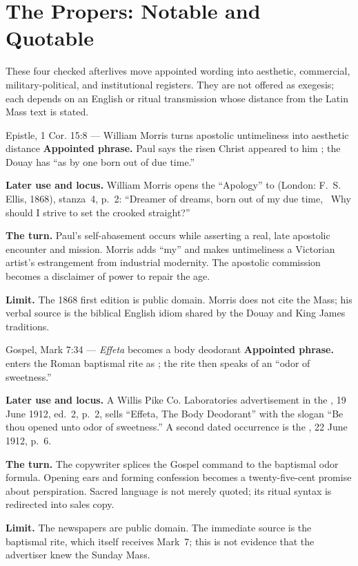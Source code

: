 \sectionguard
\section*{The Propers: Notable and Quotable}

These four checked afterlives move appointed wording into aesthetic,
commercial, military-political, and institutional registers. They are not
offered as exegesis; each depends on an English or ritual transmission whose
distance from the Latin Mass text is stated.

\begin{afterlife}{Epistle, 1 Cor. 15:8 --- William Morris turns apostolic untimeliness into aesthetic distance}
\textbf{Appointed phrase.} Paul says the risen Christ appeared to him
; the Douay has ``as by one born out of due time.''

\textbf{Later use and locus.} William Morris opens the ``Apology'' to
 (London: F.~S. Ellis, 1868), stanza~4, p.~2:
``Dreamer of dreams, born out of my due time, \textbar\ Why should I strive
to set the crooked straight?''

\textbf{The turn.} Paul's self-abasement occurs while asserting a real, late
apostolic encounter and mission. Morris adds ``my'' and makes untimeliness a
Victorian artist's estrangement from industrial modernity. The apostolic
commission becomes a disclaimer of power to repair the age.

\textbf{Limit.} The 1868 first edition is public domain. Morris does not cite
the Mass; his verbal source is the biblical English idiom shared by the Douay
and King James traditions.
\end{afterlife}

\begin{afterlife}{Gospel, Mark 7:34 --- \emph{Effeta} becomes a body deodorant}
\textbf{Appointed phrase.}  enters the
Roman baptismal rite as ; the rite then speaks of an ``odor of
sweetness.''

\textbf{Later use and locus.} A Willis Pike Co. Laboratories advertisement in
the , 19 June 1912, ed.~2, p.~2, sells
``Effeta, The Body Deodorant'' with the slogan ``Be thou opened unto odor of
sweetness.'' A second dated occurrence is the ,
22 June 1912, p.~6.

\textbf{The turn.} The copywriter splices the Gospel command to the baptismal
odor formula. Opening ears and forming confession becomes a twenty-five-cent
promise about perspiration. Sacred language is not merely quoted; its ritual
syntax is redirected into sales copy.

\textbf{Limit.} The newspapers are public domain. The immediate source is the
baptismal rite, which itself receives Mark~7; this is not evidence that the
advertiser knew the Sunday Mass.
\end{afterlife}

